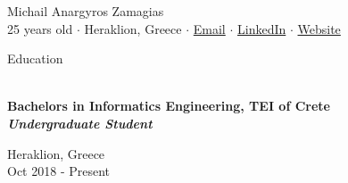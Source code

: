 \documentclass[a4paper, 11pt]{article}
\newcommand{\lineunder} {
    \vspace*{-8pt} \\
    \hspace*{-18pt} \hrulefill \\
}
\newcommand{\header} [1] {
    \vspace*{6mm}
    {\hspace*{-18pt}\vspace*{6pt} #1}
    \vspace*{-6pt} \lineunder
}
\newcommand{\education}[4]{ %
    \vspace*{6pt} %
    \begin{minipage}[t]{0.75\textwidth}
        {\Large \textbf{#1}} \\ %
        \vspace*{2pt}
        {\textbf{\textit{#2}}} \\ %
    \end{minipage} \hfill
    \begin{minipage}[t]{0.2\textwidth}
        \raggedleft
        \sloppy
        #3 \\
        #4
    \end{minipage}
    \vspace*{6pt} %
}
\newcommand{\socialmediabutton}[2]{%
    \href{#1}{#2}
}
\begin{document}
\vspace*{-30pt}

\begin{center}
    {\Huge {Michail Anargyros Zamagias}} \\\vspace*{2mm}
    25 years old $\cdot$
    Heraklion, Greece $\cdot$
    \socialmediabutton{mailto:contact@mikezamayias.com}{Email}$\cdot$
    \socialmediabutton{https://linkedin.com/in/mikezamayias}{LinkedIn}$\cdot$
    \socialmediabutton{https://mikezamayias.com}{Website}
\end{center}

\header{Education}
\education
{Bachelors in Informatics Engineering, TEI of Crete}
{Undergraduate Student}
{Heraklion, Greece}
{Oct 2018 - Present}
\end{document}

